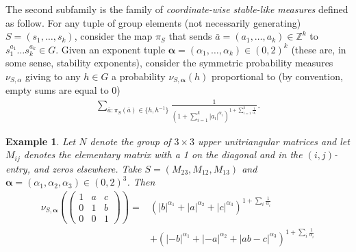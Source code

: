 \documentclass[pdflatex,sn-mathphys-num]{sn-jnl}%
\theoremstyle{thmstyleone}%
\theoremstyle{thmstyletwo}%
\newtheorem{exa}{Example}%
\theoremstyle{thmstylethree}%
\begin{document}
The second subfamily is the family of {\em coordinate-wise stable-like measures} defined as follow.
For any tuple of group elements (not necessarily generating) $S=(s_1,\ldots,s_k)$, consider the map $\pi_S$ that sends $ \bar{a}=(a_1,\ldots,a_k) \in \mathbb{Z}^k$ to $s_{1}^{a_1}\ldots s_{k}^{a_k} \in G$.  Given an exponent tuple $\bm{\alpha} = (\alpha_1,\ldots, \alpha_k) \in (0,2)^k$ (these are, in some sense, stability exponents), consider the symmetric probability measures $\nu_{S, \alpha}$  giving to any $h\in G$ a probability $\nu_{S,\bm{\alpha}}(h)$ proportional to (by convention, empty sums are equal to $0$)
\begin{align}
\label{cwsl}      
     \sum\limits_{ \bar{a}: 
      \pi_S(\bar{a})\in \{h,h^{-1}\} } \frac{1}{\left(1+ \sum_{i=1}^k |a_i|^{\alpha_i}\right)^{1 + \sum_{i=1}^k \frac{1}{\alpha_i}}} . 
\end{align}

\begin{exa}
  Let $N$ denote the group of \(3\times 3\) upper unitriangular matrices and let
$M_{ij}$ denotes the elementary matrix with a 1 on the diagonal and 
in the $(i,j)$-entry, and   zeros elsewhere. Take $S = (M_{23}, M_{12}, M_{13})$ and $\bm{\alpha} = (\alpha_1, \alpha_2,\alpha_3) \in (0,2)^3$. 
Then 
\begin{align*}
    \nu_{S,\bm{\alpha}}\left( \begin{pmatrix}
1 & a & c \\
0 & 1 & b \\
0 & 0 & 1
\end{pmatrix}\right) =  &\left( |b|^{\alpha_1} + |a|^{\alpha_2} + |c|^{\alpha_3} \right)^{1+ \sum_i \frac{1}{\alpha_i}} \\
& +  \left( |-b|^{\alpha_1} + |-a|^{\alpha_2} + |ab-c|^{\alpha_3} \right)^{1+ \sum_i \frac{1}{\alpha_i}} 
\end{align*}

\end{exa}
\end{document}
